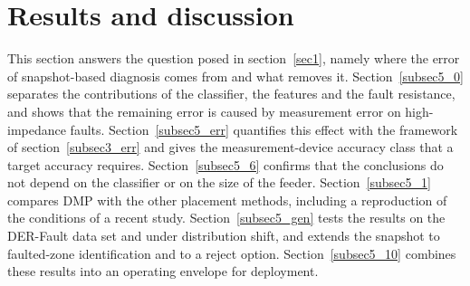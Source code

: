 \documentclass[11pt]{article}
\newenvironment{nw}{}{}
\begin{document}
\section{Results and discussion}\label{sec5}

\begin{nw}
This section answers the question posed in section~\ref{sec1}, namely where the error of snapshot-based diagnosis comes from and what removes it. Section~\ref{subsec5_0} separates the contributions of the classifier, the features and the fault resistance, and shows that the remaining error is caused by measurement error on high-impedance faults. Section~\ref{subsec5_err} quantifies this effect with the framework of section~\ref{subsec3_err} and gives the measurement-device accuracy class that a target accuracy requires. Section~\ref{subsec5_6} confirms that the conclusions do not depend on the classifier or on the size of the feeder. Section~\ref{subsec5_1} compares DMP with the other placement methods, including a reproduction of the conditions of a recent study. Section~\ref{subsec5_gen} tests the results on the DER-Fault data set and under distribution shift, and extends the snapshot to faulted-zone identification and to a reject option. Section~\ref{subsec5_10} combines these results into an operating envelope for deployment.
\end{nw}
\end{document}
